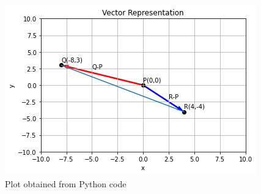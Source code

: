 \begin{figure}[!ht]
\centering
\includegraphics[width=\columnwidth]{solutions/2/2/1/image.png}
\caption{Plot obtained from Python code}
\label{2/2/1/Fig:1}
\end{figure}